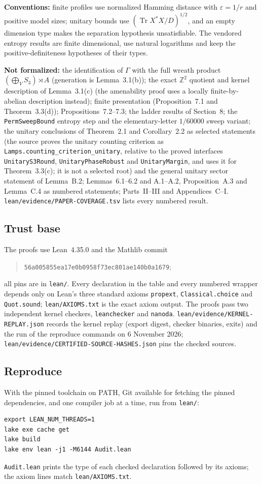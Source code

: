 \noindent\textbf{Conventions:} finite profiles use normalized Hamming distance
with $\varepsilon=1/r$ and positive model sizes; unitary bounds use
$(\operatorname{Tr}X^*X/D)^{1/2}$, and an empty dimension type makes the
separation hypothesis unsatisfiable. The vendored entropy results are finite
dimensional, use natural logarithms and keep the positive-definiteness
hypotheses of their types.

\noindent\textbf{Not formalized:} the identification of $\Gamma$ with the full
wreath product $(\bigoplus_V S_3)\rtimes A$ (generation is Lemma~3.1(b)); the
exact $\mathbb Z^2$ quotient and kernel description of Lemma~3.1(c) (the
amenability proof uses a locally finite-by-abelian description instead);
finite presentation (Proposition~7.1 and Theorem~3.3(d));
Propositions~7.2--7.3; the ladder results of Section~8; the
\nolinkurl{PermSweepBound} entropy step and the elementary-letter $1/60000$
sweep variant; the unitary conclusions of Theorem~2.1 and Corollary~2.2 as selected statements (the source proves the unitary counting criterion as \nolinkurl{Lamps.counting_criterion_unitary}, relative to the proved interfaces \nolinkurl{UnitaryS3Round}, \nolinkurl{UnitaryPhaseRobust} and \nolinkurl{UnitaryMargin}, and uses it for Theorem~3.3(c); it is not a selected root)
and the general unitary sector statement of Lemma~B.2; Lemmas~6.1--6.2 and
A.1--A.2, Proposition~A.3 and Lemma~C.4 as numbered statements; Parts~II--III
and Appendices~C--I. \nolinkurl{lean/evidence/PAPER-COVERAGE.tsv} lists every
numbered result.

\subsection*{Trust base}
The proofs use Lean~4.35.0 and the Mathlib commit
\begin{quote}\small
\nolinkurl{56a005855ea17e0b0958f73ec801ae140b0a1679};
\end{quote}
all pins are in \nolinkurl{lean/}. Every declaration in the table and every
numbered wrapper depends only on Lean's three standard axioms
\texttt{propext}, \texttt{Classical.choice} and \texttt{Quot.sound};
\nolinkurl{lean/AXIOMS.txt} is the exact axiom output. The proofs pass two
independent kernel checkers, \texttt{leanchecker} and \texttt{nanoda}.
\nolinkurl{lean/evidence/KERNEL-REPLAY.json} records the kernel replay (export digest, checker binaries, exits) and the run of the reproduce commands on 6 November 2026; \nolinkurl{lean/evidence/CERTIFIED-SOURCE-HASHES.json} pins the checked sources.

\subsection*{Reproduce}
With the pinned toolchain on PATH, Git available for fetching the pinned
dependencies, and one compiler job at a time, run from \texttt{lean/}:
\begin{verbatim}
export LEAN_NUM_THREADS=1
lake exe cache get
lake build
lake env lean -j1 -M6144 Audit.lean
\end{verbatim}
\texttt{Audit.lean} prints the type of each checked declaration followed by its
axioms; the axiom lines match \nolinkurl{lean/AXIOMS.txt}.
